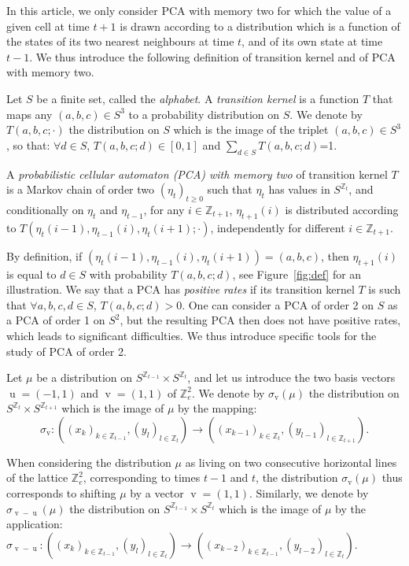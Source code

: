 \documentclass[AHL,Unicode,longabstracts]{cedram}
\newcounter{a}
\newcommand{\Z}{\mathbb{Z}}
\DeclareMathOperator{\vu}{u}
\DeclareMathOperator{\vv}{v}
\let\oldforall\forall
\renewcommand*{\forall}{\mathrel{\oldforall}}
\begin{document}
In this article, we only consider PCA with memory two for which the value of a given cell at time $t+1$ is drawn according to a distribution which is a function of the states of its two nearest neighbours at time $t$, and of its own state at time $t-1$. We thus introduce the following definition of transition kernel and of PCA with memory two.

\begin{definition}
Let $S$ be a finite set, called the \emph{alphabet}. A \emph{transition kernel} is a function $T$ that maps any $(a,b,c)\in S^3$ to a probability distribution on $S$. We denote by $T(a,b,c;\cdot)$ the distribution on $S$ which is the image of the triplet $(a,b,c)\in S^3$, so that: $\forall d\in S$, $T(a,b,c;d)\in [0,1]$ and $\sum_{d \in S} T(a,b,c;d)$=1.

A \emph{probabilistic cellular automaton (PCA) with memory two} of transition kernel $T$ is a Markov chain of order two $(\eta_t)_{t\geq 0}$ such that $\eta_t$ has values in $S^{\Z_t}$, and conditionally on $\eta_t$ and $\eta_{t-1}$, for any $i \in \Z_{t+1}$, $\eta_{t+1}(i)$ is distributed according to $T(\eta_t(i-1),\eta_{t-1}(i),\eta_{t}(i+1);\cdot)$, independently for different $i \in\Z_{t+1}$.
\end{definition}

By definition, if $(\eta_t(i-1),\eta_{t-1}(i),\eta_{t}(i+1))=(a,b,c)$, then $\eta_{t+1}(i)$ is equal to $d\in S$ with probability $T(a,b,c;d)$, see Figure~\ref{fig:def} for an illustration. We say that a PCA has \emph{positive rates} if its transition kernel $T$ is such that $\forall a,b,c,d\in S$, $T(a,b,c;d)>0$. One can consider a PCA of order 2 on $S$ as a PCA of order 1 on $S^2$, but the resulting PCA then does not have positive rates, which leads to significant difficulties. We thus introduce specific tools for the study of PCA of order 2.

Let $\mu$ be a distribution on $S^{\Z_{t-1}}\times S^{\Z_{t}}$, and let us introduce the two basis vectors $\vu=(-1,1)$ and $\vv=(1,1)$ of $\Z_{e}^2$. We denote by $\sigma_{\vv}(\mu)$ the distribution on $S^{\Z_{t}}\times S^{\Z_{t+1}}$ which is the image of $\mu$ by the mapping:
\[
\sigma_{\vv}: \left((x_k)_{k\in \Z_{t-1}},(y_l)_{l\in \Z_{t}}\right) \rightarrow \left((x_{k-1})_{k\in \Z_{t}},(y_{l-1})_{l\in \Z_{t+1}}\right).
\]

When considering the distribution $\mu$ as living on two consecutive horizontal lines of the lattice $\Z_{e}^2$, corresponding to times $t-1$ and $t$, the distribution $\sigma_{\vv}(\mu)$ thus corresponds to shifting $\mu$ by a vector $\vv=(1,1)$. Similarly, we denote by $\sigma_{\vv-\vu}(\mu)$ the distribution on $S^{\Z_{t-1}}\times S^{\Z_{t}}$ which is the image of $\mu$ by the application: $\sigma_{\vv-\vu}:\left((x_k)_{k\in \Z_{t-1}},(y_l)_{l\in \Z_{t}}\right) \rightarrow \left((x_{k-2})_{k\in \Z_{t-1}},(y_{l-2})_{l\in \Z_{t}}\right).$
\end{document}
